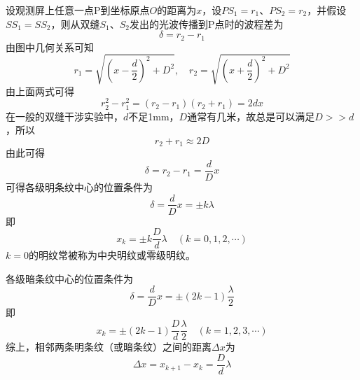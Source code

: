 \documentclass[12pt]{article}
\begin{document}
设观测屏上任意一点P到坐标原点\(O\)的距离为\(x\)，设\(PS_1 = r_1\)、\(PS_2 = r_2\)，并假设\(SS_1=SS_2\)，则从双缝\(S_1\)、\(S_2\)发出的光波传播到P点时的波程差为
\begin{equation}
    \delta = r_2 - r_1
\end{equation}
由图中几何关系可知
\begin{equation*}
r_1=\sqrt{\left(x-\frac{d}{2}\right)^2+D^2}, \quad r_2=\sqrt{\left(x+\frac{d}{2}\right)^2+D^2}
\end{equation*}
由上面两式可得
\begin{equation}
    r_2^2 - r_1^2 = (r_2 - r_1)(r_2 + r_1) = 2 d x
\end{equation}
在一般的双缝干涉实验中，\(d\)不足1mm，\(D\)通常有几米，故总是可以满足\(D >> d\)，所以
\begin{equation}
    r_2 + r_1 \approx 2D
\end{equation}
由此可得
\begin{equation}
\delta=r_2-r_1=\frac{d}{D} x
\end{equation}
可得各级明条纹中心的位置条件为
\begin{equation}
\delta=\frac{d}{D} x= \pm k \lambda
\end{equation}
即
\begin{equation}
x_k= \pm k \frac{D}{d} \lambda \quad(k=0,1,2, \cdots)
\end{equation}
\(k=0\)的明纹常被称为中央明纹或零级明纹。

各级暗条纹中心的位置条件为
\begin{equation}
\delta=\frac{d}{D} x= \pm (2k-1) \frac{\lambda}{2}
\end{equation}
即
\begin{equation}
x_k= \pm (2k-1) \frac{D}{d} \frac{\lambda}{2} \quad(k=1,2,3, \cdots)
\end{equation}
综上，相邻两条明条纹（或暗条纹）之间的距离\(\Delta x\)为
\begin{equation}
\Delta x=x_{k+1}-x_k=\frac{D}{d} \lambda
\end{equation}
\end{document}
